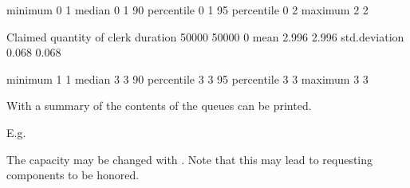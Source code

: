 \documentclass[letterpaper,10pt,english]{sphinxmanual}
\begin{document}
\begin{sphinxVerbatim}[commandchars=\\\{\}]
                                             minimum               0            1
                                             median                0            1
                                             90\PYGZpc{} percentile        0            1
                                             95\PYGZpc{} percentile        0            2
                                             maximum               2            2

Claimed quantity of clerk                    duration          50000        50000            0
                                             mean                  2.996        2.996
                                             std.deviation         0.068        0.068

                                             minimum               1            1
                                             median                3            3
                                             90\PYGZpc{} percentile        3            3
                                             95\PYGZpc{} percentile        3            3
                                             maximum               3            3
\end{sphinxVerbatim}

With  a summary of the contents of the queues can be printed.

E.g.

\begin{sphinxVerbatim}[commandchars=\\\{\}]
 
   
            
            
   
            
            
            
\end{sphinxVerbatim}

The capacity may be changed with . Note that this may lead to requesting
components to be honored.
\end{document}
